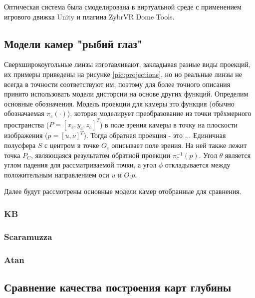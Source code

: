 Оптическая система была смоделирована в виртуальной среде с применением игрового движка Unity и плагина ZybrVR Dome Tools. %

\subsection{Модели камер "рыбий глаз"}

Сверхширокоугольные линзы изготавливают, закладывая разные виды проекций, их примеры приведены на рисунке \ref{pic:projections}, но 
но реальные линзы не всегда в точности соответствуют им, поэтому для более точного описания принято использовать модели дисторсии
 на основе других функций.
Определим основные обозначения. Модель проекции для камеры это функция (обычно обозначаемая $\pi_c(\cdot )$), которая моделирует преобразование 
из точки трёхмерного пространства ($P=[x_c, y_c, z_c]^T$) в поле зрения камеры в точку на плоскости изображения ($p=[u, \nu]^T$). Тогда обратная
проекция - это ... Единичная            %
полусфера $S$ с центром в точке $O_c$ описывает поле зрения. На ней также лежит точка $P_C$, являющаяся результатом обратной проекции $\pi^{-1}_c({p})$.
Угол $\theta$ является углом падения для рассматриваемой точки, а угол $\phi$ откладывается между положительным направлением оси $u$ и $O_{i}{p}$. 

Далее будут рассмотрены основные модели камер отобранные для сравнения.

\subsubsection{KB}

\subsubsection{Scaramuzza}

\subsubsection{Atan}

\subsection{Сравнение качества построения карт глубины}


